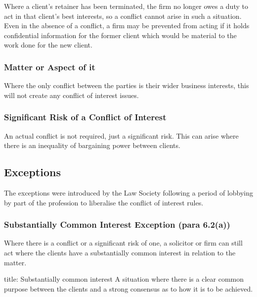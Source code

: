 \documentclass[
]{article}
\newenvironment{Shaded}{}{}
\newcommand{\NormalTok}[1]{#1}
\begin{document}
Where a client's retainer has been terminated, the firm no longer owes a
duty to act in that client's best interests, so a conflict cannot arise
in such a situation. Even in the absence of a conflict, a firm may be
prevented from acting if it holds confidential information for the
former client which would be material to the work done for the new
client.

\hypertarget{matter-or-aspect-of-it}{%
\subsubsection{Matter or Aspect of it}\label{matter-or-aspect-of-it}}

Where the only conflict between the parties is their wider business
interests, this will not create any conflict of interest issues.

\hypertarget{significant-risk-of-a-conflict-of-interest}{%
\subsubsection{Significant Risk of a Conflict of
Interest}\label{significant-risk-of-a-conflict-of-interest}}

An actual conflict is not required, just a significant risk. This can
arise where there is an inequality of bargaining power between clients.

\hypertarget{exceptions}{%
\subsection{Exceptions}\label{exceptions}}

The exceptions were introduced by the Law Society following a period of
lobbying by part of the profession to liberalise the conflict of
interest rules.

\hypertarget{substantially-common-interest-exception-para-6.2a}{%
\subsubsection{Substantially Common Interest Exception (para
6.2(a))}\label{substantially-common-interest-exception-para-6.2a}}

Where there is a conflict or a significant risk of one, a solicitor or
firm can still act where the clients have a substantially common
interest in relation to the matter.

\begin{Shaded}
\begin{Highlighting}[]
\NormalTok{title: Substantially common interest}
\NormalTok{A situation where there is a clear common purpose between the clients and a strong consensus as to how it is to be achieved. }
\end{Highlighting}
\end{Shaded}
\end{document}
